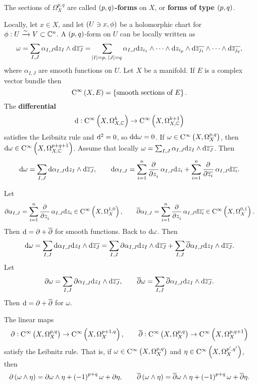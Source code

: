 \begin{definition}
The sections of $ \Omega_X^{p, q} $ are called \textbf{$ \br{p, q} $-forms} on $ X $, or \textbf{forms of type $ \br{p, q} $}.
\end{definition}

Locally, let $ x \in X $, and let $ \br{U \ni x, \phi} $ be a holomorphic chart for $ \phi : U \xrightarrow{\sim} V \subset \mathbb{C}^n $. A $ \br{p, q} $-form on $ U $ can be locally written as
$$ \omega = \sum_{I, J} \alpha_{I, J}\d z_I \wedge \d\overline{z_J} = \sum_{\abs{I} = p, \ \abs{J} = q} \alpha_{I, J}\d z_{i_1} \wedge \dots \wedge \d z_{i_p} \wedge \d\overline{z_{j_1}} \wedge \dots \wedge \d\overline{z_{j_q}}, $$
where $ \alpha_{I, J} $ are smooth functions on $ U $. Let $ X $ be a manifold. If $ E $ is a complex vector bundle then
$$ \Ci{X, E} = \cbr{\text{smooth sections of} \ E}. $$
The \textbf{differential}
$$ \d : \COC{X}{k} \to \COC{X}{k + 1} $$
satisfies the Leibnitz rule and $ \mathrm{d}^2 = 0 $, so $ \mathrm{d}\mathrm{d}\omega = 0 $. If $ \omega \in \CO{X}{p, q} $, then $ \d\omega \in \COC{X}{p + q + 1} $. Assume that locally $ \omega = \sum_{I, J} \alpha_{I, J}\mathrm{d} z_I \wedge \mathrm{d}\overline{z_J} $. Then
$$ \d\omega = \sum_{I, J} \d\alpha_{I, J}\d z_I \wedge \d\overline{z_J}, \qquad \d\alpha_{I, J} = \sum_{i = 1}^n \dpd{}{z_i}\alpha_{I, J}\d z_i + \sum_{i = 1}^n \dpd{}{\overline{z_i}}\alpha_{I, J}\d\overline{z_i}. $$

\pagebreak

Let
$$ \da\alpha_{I, J} = \sum_{i = 1}^n \dpd{}{z_i}\alpha_{I, J}\d z_i \in \CO{X}{1, 0}, \qquad \dab\alpha_{I, J} = \sum_{i = 1}^n \dpd{}{z_i}\alpha_{I, J}\d\overline{z_i} \in \CO{X}{0, 1}. $$
Then $ \mathrm{d} = \partial + \overline{\partial} $ for smooth functions. Back to $ \mathrm{d}\omega $. Then
$$ \mathrm{d}\omega = \sum_{I, J} \mathrm{d}\alpha_{I, J}\mathrm{d} z_I \wedge \mathrm{d}\overline{z_J} = \sum_{I, J} \partial\alpha_{I, J}\mathrm{d} z_I \wedge \mathrm{d}\overline{z_J} + \sum_{I, J} \overline{\partial}\alpha_{I, J}\mathrm{d} z_I \wedge \mathrm{d}\overline{z_J}. $$
Let
$$ \partial\omega = \sum_{I, J} \partial\alpha_{I, J}\mathrm{d} z_I \wedge \mathrm{d}\overline{z_J}, \qquad \overline{\partial}\omega = \sum_{I, J} \overline{\partial}\alpha_{I, J}\mathrm{d} z_I \wedge \mathrm{d}\overline{z_J}. $$
Then $ \mathrm{d} = \partial + \overline{\partial} $ for $ \omega $.

\begin{lemma}
The linear maps
$$ \da : \CO{X}{p, q} \to \CO{X}{p + 1, q}, \qquad \dab : \CO{X}{p, q} \to \CO{X}{p, q + 1} $$
satisfy the Leibnitz rule. That is, if $ \omega \in \CO{X}{p, q} $ and $ \eta \in \CO{X}{p', q'} $, then
$$ \da\br{\omega \wedge \eta} = \da\omega \wedge \eta + \br{-1}^{p + q}\omega + \da\eta, \qquad \dab\br{\omega \wedge \eta} = \dab\omega \wedge \eta + \br{-1}^{p + q}\omega + \dab\eta. $$
\end{lemma}

